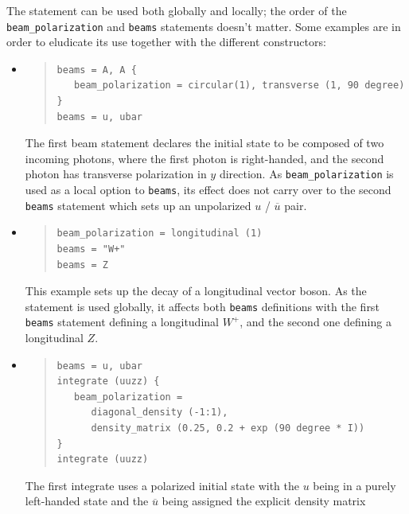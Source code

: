 \documentclass[12pt]{book}
\newcommand{\ttt}[1]{\texttt{#1}}
\begin{document}
The statement can be used both globally and locally; the order of the
\ttt{beam\_polarization} and \ttt{beams} statements doesn't matter.
Some examples are in order to eludicate its use together with the different
constructors:
%
\begin{itemize}
\item
\begin{quote}
\begin{footnotesize}
\begin{verbatim}
beams = A, A {
   beam_polarization = circular(1), transverse (1, 90 degree)
}
beams = u, ubar
\end{verbatim}
\end{footnotesize}
\end{quote}
The first beam statement declares the initial state to be composed of two
incoming photons, where the first photon is right-handed, and the second photon
has transverse polarization in $y$ direction. As \ttt{beam\_polarization} is
used as a local option to \ttt{beams}, its effect does not carry over to the
second \ttt{beams} statement which sets up an unpolarized $u$ / $\overline{u}$
pair.
%
\item
\begin{quote}
\begin{footnotesize}
\begin{verbatim}
beam_polarization = longitudinal (1)
beams = "W+"
beams = Z
\end{verbatim}
\end{footnotesize}
\end{quote}
This example sets up the decay of a longitudinal vector boson. As the statement is
used globally, it affects both \ttt{beams} definitions with the first \ttt{beams}
statement defining a longitudinal $W^+$, and the second one defining a
longitudinal $Z$.
%
\item
\begin{quote}
\begin{footnotesize}
\begin{verbatim}
beams = u, ubar
integrate (uuzz) {
   beam_polarization =
      diagonal_density (-1:1),
      density_matrix (0.25, 0.2 + exp (90 degree * I))
}
integrate (uuzz)
\end{verbatim}
\end{footnotesize}
\end{quote}
The first integrate uses a polarized initial state with the $u$ being in a
purely left-handed state and the $\overline{u}$ being assigned the explicit
density matrix
{\renewcommand{\arraystretch}{1.5}
}
\end{itemize}
\end{document}

